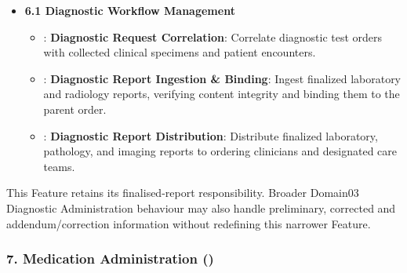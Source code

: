 \begin{itemize}

\item
\textbf{6.1 Diagnostic Workflow Management}


\begin{itemize}

\item
\texttt{}: \textbf{Diagnostic Request Correlation}: Correlate diagnostic test orders with collected clinical specimens and patient encounters.



\item
\texttt{}: \textbf{Diagnostic Report Ingestion \& Binding}: Ingest finalized laboratory and radiology reports, verifying content integrity and binding them to the parent order.



\item
\texttt{}: \textbf{Diagnostic Report Distribution}: Distribute finalized laboratory, pathology, and imaging reports to ordering clinicians and designated care teams.



\end{itemize}


\end{itemize}
\label{rad:enabling:314}

This Feature retains its finalised-report responsibility. Broader Domain03 Diagnostic Administration behaviour may also handle preliminary, corrected and addendum/\allowbreak{}correction information without redefining this narrower Feature.

\label{rad:enabling:316}
\subsubsection*{7. Medication Administration (\texttt{})}
\label{rad:enabling:317}

